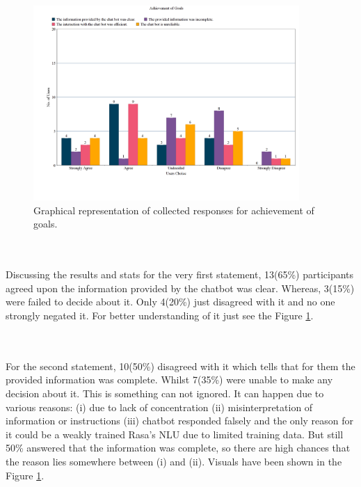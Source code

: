 \begin{figure}[!h]
    \centering
    \includegraphics[width=0.9\textwidth]{img/Achievement_of_Goals.png}
    \caption{Graphical representation of collected responses for achievement of goals.}
    \label{fig:achievGoals}
\end{figure}
\\~\\
Discussing the results and stats for the very first statement, 13(65\%) participants agreed upon the information provided by the chatbot was clear. Whereas, 3(15\%) were failed to decide about it. Only 4(20\%) just disagreed with it and no one strongly negated it. For better understanding of it just see the Figure \ref{fig:achievGoals}.

\\~\\
For the second statement, 10(50\%) disagreed with it which tells that for them the provided information was complete. Whilst 7(35\%) were unable to make any decision about it. This is something can not ignored. It can happen due to various reasons: (i) due to lack of concentration (ii) misinterpretation of information or instructions (iii) chatbot responded falsely and the only reason for it could be a weakly trained Rasa's NLU due to limited training data. But still 50\% answered that the information was complete, so there are high chances that the reason lies somewhere between (i) and (ii). Visuals have been shown in the Figure \ref{fig:achievGoals}.

